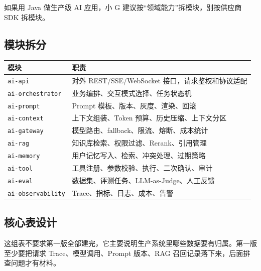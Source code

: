\documentclass[10pt,a4paper]{ctexart}
\begin{document}
如果用 Java 做生产级 AI 应用，小 G 建议按“领域能力”拆模块，别按供应商 SDK 拆模块。



\subsection{模块拆分}

{\footnotesize
\begin{tabularx}{\textwidth}{|X|X|}
\hline
\textbf{模块} & \textbf{职责} \\
\hline
\texttt{ai-api} & 对外 REST/SSE/WebSocket 接口，请求鉴权和协议适配 \\
\hline
\texttt{ai-orchestrator} & 业务编排、交互模式选择、任务状态机 \\
\hline
\texttt{ai-prompt} & Prompt 模板、版本、灰度、渲染、回滚 \\
\hline
\texttt{ai-context} & 上下文组装、Token 预算、历史压缩、上下文分区 \\
\hline
\texttt{ai-gateway} & 模型路由、fallback、限流、熔断、成本统计 \\
\hline
\texttt{ai-rag} & 知识库检索、权限过滤、Rerank、引用管理 \\
\hline
\texttt{ai-memory} & 用户记忆写入、检索、冲突处理、过期策略 \\
\hline
\texttt{ai-tool} & 工具注册、参数校验、执行、二次确认、审计 \\
\hline
\texttt{ai-eval} & 数据集、评测任务、LLM-as-Judge、人工反馈 \\
\hline
\texttt{ai-observability} & Trace、指标、日志、成本、告警 \\
\hline
\end{tabularx}
}



\subsection{核心表设计}


这组表不要求第一版全部建完，它主要说明生产系统里哪些数据要有归属。第一版至少要把请求 Trace、模型调用、Prompt 版本、RAG 召回记录落下来，后面排查问题才有材料。
\end{document}
